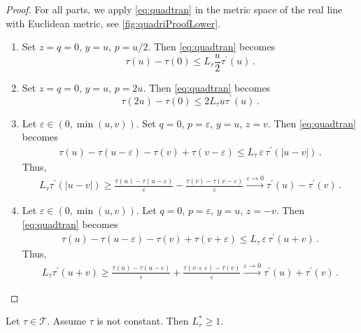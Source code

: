 \documentclass{article}
\newcommand{\abs}[1]{\left| #1 \right|} %
\newcommand*{\mc}[1]{\mathcal{#1}}
\newcommand{\pr}{^\prime}
\newcommand{\equationFullstop}{\, .}
\newcommand{\eqfs}{\equationFullstop}
\newcommand{\tran}{\tau}
\newcommand{\Tran}{\mc{T}}
\newcommand{\dtran}{\tran\pr}
\newcommand{\ctransymbol}{L}
\newcommand{\ctrano}[1]{\ctransymbol_{#1}}
\newcommand{\ctranobest}[1]{\ctransymbol_{#1}^{*}}
\newcommand{\ctranbest}{\ctranobest{\tran}}
\newcommand{\ctran}{\ctrano{\tran}}
\begin{document}
\begin{proof}
	For all parts, we apply \eqref{eq:quadtran} in the metric space of the real line with Euclidean metric, see \cref{fig:quadriProofLower}.
	\begin{enumerate}[label=(\roman*)]
		\item Set $z=q=0$, $y=u$, $p = u/2$. Then \eqref{eq:quadtran} becomes
		\begin{equation*}
			\tran(u) - \tran(0) \leq \ctran \frac u2 \dtran(u)
			\eqfs
		\end{equation*}
		\item 
		Set $z=q=0$, $y=u$, $p = 2u$.
		Then \eqref{eq:quadtran} becomes
		\begin{equation*}
			\tran(2u) - \tran(0) \leq 2 \ctran u \dtran(u)
			\eqfs
		\end{equation*}
		\item 
		Let $\varepsilon\in(0, \min(u,v))$. Set $q = 0$, $p = \varepsilon$, $y = u$, $z = v$.
		Then \eqref{eq:quadtran} becomes
		\begin{align*}
			\tran(u)  - \tran(u-\varepsilon) - \tran(v) + \tran(v-\varepsilon) \leq \ctran\,  \varepsilon \, \dtran(\abs{u-v})
			\eqfs
		\end{align*}
		Thus,
		\begin{align*}
			\ctran \dtran(\abs{u-v}) \geq 
			\frac{\tran(u)  - \tran(u-\varepsilon)}{\varepsilon} -\frac{\tran(v) - \tran(v-\varepsilon)}{\varepsilon}
			\xrightarrow{\varepsilon \to 0}
			\dtran(u) - \dtran(v)
			\eqfs
		\end{align*}
		\item 
		Let $\varepsilon\in(0, \min(u,v))$. Let $q = 0$, $p = \varepsilon$, $y = u$, $z = -v$.
		Then \eqref{eq:quadtran} becomes
		\begin{align*}
			\tran(u)  - \tran(u-\varepsilon) - \tran(v) + \tran(v+\varepsilon) \leq \ctran\,  \varepsilon \, \dtran(u+v)
			\eqfs
		\end{align*}
		Thus,
		\begin{align*}
			\ctran \dtran(u+v) \geq 
			\frac{\tran(u)  - \tran(u-\varepsilon)}{\varepsilon}  + \frac{\tran(v+\varepsilon) - \tran(v)}{\varepsilon}
			\xrightarrow{\varepsilon \to 0}
			\dtran(u) + \dtran(v)
			\eqfs
		\end{align*}
	\end{enumerate}
\end{proof}
%
\begin{proposition}\label{lmm:constLowerBoundOne}
	Let $\tran\in\Tran$. Assume $\tran$ is not constant. Then $\ctranbest \geq 1$.
\end{proposition}
\end{document}
